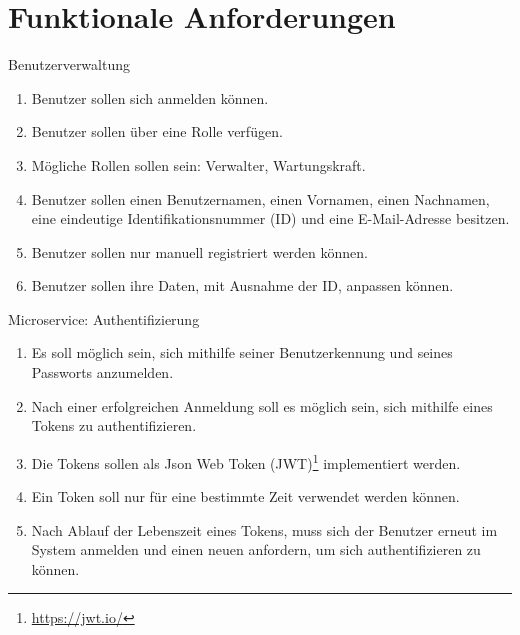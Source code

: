 \documentclass[12pt]{scrreprt}
\newcommand{\itemh}[1]{{\bfseries\large\item #1}}
\begin{document}
  \section{Funktionale Anforderungen}
  \begin{enumerate}
    \itemh{Benutzerverwaltung}
    \begin{enumerate}
      \item Benutzer sollen sich anmelden können.
      \item Benutzer sollen über eine Rolle verfügen.
      \item Mögliche Rollen sollen sein: Verwalter, Wartungskraft.
      \item Benutzer sollen einen Benutzernamen, einen Vornamen, einen Nachnamen, eine eindeutige Identifikationsnummer
        (ID) und eine E-Mail-Adresse besitzen.
      \item Benutzer sollen nur manuell registriert werden können.
      \item Benutzer sollen ihre Daten, mit Ausnahme der ID, anpassen können.
    \end{enumerate}

    \itemh{Microservice: Authentifizierung}
    \begin{enumerate}
      \item Es soll möglich sein, sich mithilfe seiner Benutzerkennung und seines Passworts anzumelden.
      \item Nach einer erfolgreichen Anmeldung soll es möglich sein, sich mithilfe eines Tokens zu authentifizieren.
      \item Die Tokens sollen als Json Web Token (JWT)\footnote{\url{https://jwt.io/}} implementiert werden.
      \item Ein Token soll nur für eine bestimmte Zeit verwendet werden können.
      \item Nach Ablauf der Lebenszeit eines Tokens, muss sich der Benutzer erneut im System anmelden und einen neuen
        anfordern, um sich authentifizieren zu können.
    \end{enumerate}


\end{enumerate}
\end{document}
